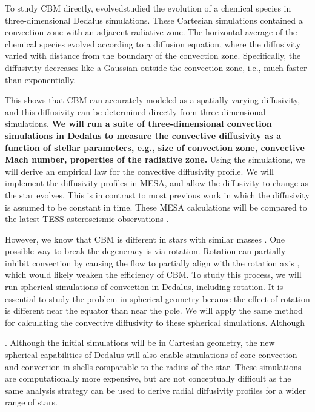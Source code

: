 To study CBM directly, \citet{Lecoanet_2016a} evolvedstudied the evolution of a chemical species in three-dimensional Dedalus simulations.  These Cartesian simulations contained a convection zone with an adjacent radiative zone. The horizontal average of the chemical species evolved according to a diffusion equation, where the diffusivity varied with distance from the boundary of the convection zone. Specifically, the diffusivity decreases like a Gaussian outside the convection zone, i.e., much faster than exponentially.

This shows that CBM can accurately modeled as a spatially varying diffusivity, and this diffusivity can be determined directly from three-dimensional simulations. \textbf{We will run a suite of three-dimensional convection simulations in Dedalus to measure the convective diffusivity as a function of stellar parameters, e.g., size of convection zone, convective Mach number, properties of the radiative zone.} Using the simulations, we will derive an empirical law for the convective diffusivity profile. We will implement the diffusivity profiles in MESA, and allow the diffusivity to change as the star evolves. This is in contrast to most previous work in which the diffusivity is assumed to be constant in time. These MESA calculations will be compared to the latest TESS asteroseismic observations \citep[similar to][]{Ghasemi_2016}.

However, we know that CBM is different in stars with similar masses \citep{Stancliffe_2015}. One possible way to break the degeneracy is via rotation. Rotation can partially inhibit convection by causing the flow to partially align with the rotation axis \cite[e.g.,][]{Featherstone_2016}, which would likely weaken the efficiency of CBM. To study this process, we will run spherical simulations of convection in Dedalus, including rotation. It is essential to study the problem in spherical geometry because the effect of rotation is different near the equator than near the pole. We will apply the same method for calculating the convective diffusivity to these spherical simulations. Although 

. Although the initial simulations will be in Cartesian geometry, the new spherical capabilities of Dedalus will also enable simulations of core convection and convection in shells comparable to the radius of the star. These simulations are computationally more expensive, but are not conceptually difficult as the same analysis strategy can be used to derive radial diffusivity profiles for a wider range of stars.
